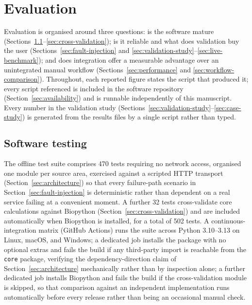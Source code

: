 \section{Evaluation}
\label{sec:evaluation}

Evaluation is organised around three questions: is the software mature
(Sections~\ref{sec:testing}--\ref{sec:cross-validation}); is it reliable and what
does validation buy the user (Sections~\ref{sec:fault-injection} and
\ref{sec:validation-study}--\ref{sec:live-benchmark}); and does integration offer
a measurable advantage over an unintegrated manual workflow
(Sections~\ref{sec:performance} and \ref{sec:workflow-comparison}). Throughout,
each reported figure states the script that produced it; every script referenced
is included in the software repository (Section~\ref{sec:availability}) and is
runnable independently of this manuscript. Every number in the validation study
(Sections~\ref{sec:validation-study}--\ref{sec:case-study}) is generated from the
results files by a single script rather than typed.

\subsection{Software testing}
\label{sec:testing}

The offline test suite comprises 470 tests requiring no network access,
organised one module per source area, exercised against a scripted HTTP
transport (Section~\ref{sec:architecture}) so that every failure-path
scenario in Section~\ref{sec:fault-injection} is deterministic rather than
dependent on a real service failing at a convenient moment. A further 32
tests cross-validate core calculations against Biopython
(Section~\ref{sec:cross-validation}) and are included automatically when
Biopython is installed, for a total of 502 tests.  A
continuous-integration matrix (GitHub Actions) runs the suite across
Python 3.10--3.13 on Linux, macOS, and Windows; a dedicated job installs the
package with no optional extras and fails the build if any third-party
import is reachable from the \texttt{core} package, verifying the
dependency-direction claim of Section~\ref{sec:architecture} mechanically
rather than by inspection alone; a further dedicated job installs Biopython
and fails the build if the cross-validation module is skipped, so that
comparison against an independent implementation runs automatically before
every release rather than being an occasional manual check.

